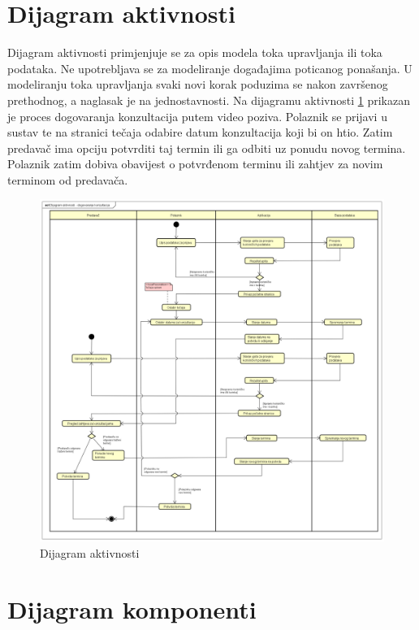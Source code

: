 		
			\eject 
		
		\section{Dijagram aktivnosti}
			
			\text Dijagram aktivnosti primjenjuje se za opis modela toka upravljanja ili toka podataka. Ne upotrebljava se za modeliranje događajima poticanog ponašanja. U modeliranju toka upravljanja svaki novi korak poduzima se nakon završenog prethodnog, a naglasak je na jednostavnosti. Na dijagramu aktivnosti \ref{fig:Dijagram_aktivnosti} prikazan je proces dogovaranja konzultacija putem video poziva. Polaznik se prijavi u sustav te na stranici tečaja odabire datum konzultacija koji bi on htio. Zatim predavač ima opciju potvrditi taj termin ili ga odbiti uz ponudu novog termina. Polaznik zatim dobiva obavijest o potvrđenom terminu ili zahtjev za novim terminom od predavača.
			\eject
			
			\begin{figure}[h]
				\includegraphics[scale=0.35]{dijagrami/Dijagram_aktivnosti.PNG}
				\centering
				\caption{Dijagram aktivnosti}
				\label{fig:Dijagram_aktivnosti}
			\end{figure}
		\eject
			
		\section{Dijagram komponenti}
		
